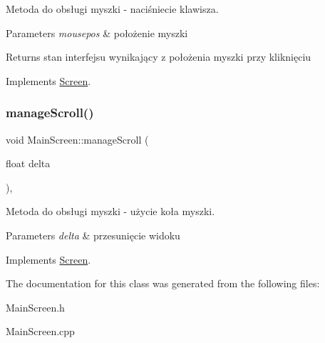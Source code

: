 Metoda do obsługi myszki -\/ naciśniecie klawisza. 


\begin{DoxyParams}{Parameters}
{\em mousepos} & położenie myszki \\
\hline
\end{DoxyParams}
\begin{DoxyReturn}{Returns}
stan interfejsu wynikający z położenia myszki przy kliknięciu 
\end{DoxyReturn}


Implements \mbox{\hyperlink{class_screen_aee89e0a473a855ddd0ae9cd38c5f2529}{Screen}}.

\mbox{\label{class_main_screen_a54826570ce34b97e35f89fdc90b98bed}} 
\subsubsection{\texorpdfstring{manageScroll()}{manageScroll()}}
{\footnotesize\ttfamily void Main\+Screen\+::manage\+Scroll (\begin{DoxyParamCaption}\item[{float}]{delta }\end{DoxyParamCaption})\hspace{0.3cm}{\ttfamily [inline]}, {\ttfamily [virtual]}}



Metoda do obsługi myszki -\/ użycie koła myszki. 


\begin{DoxyParams}{Parameters}
{\em delta} & przesunięcie widoku \\
\hline
\end{DoxyParams}


Implements \mbox{\hyperlink{class_screen_a039b9d63b0afafff7af22c26e2d81f5e}{Screen}}.



The documentation for this class was generated from the following files\+:\begin{DoxyCompactItemize}
\item 
Main\+Screen.\+h\item 
Main\+Screen.\+cpp\end{DoxyCompactItemize}

